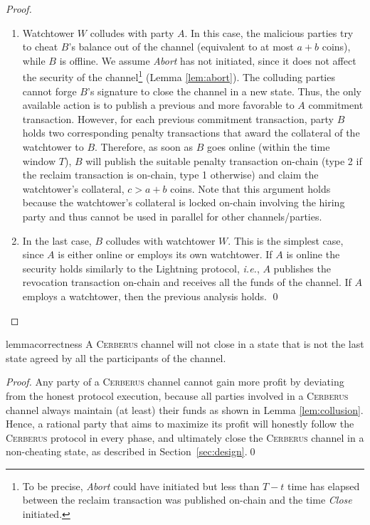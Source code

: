 \documentclass[runningheads]{llncs}
\newcommand{\ie}{{\em i.e.}}
\newcommand{\sys}{\textsc{Cerberus}\xspace}
\begin{document}
\begin{proof}
\begin{enumerate}[label=(\roman*)]
    \item Watchtower $W$ colludes with party $A$.
    In this case, the malicious parties try to cheat $B$'s balance out of the channel (equivalent to at most $a+b$ coins), while $B$ is offline.
    We assume \textit{Abort} has not initiated, since it does not affect the security of the channel\footnote{To be precise, \textit{Abort} could have initiated but less than $T-t$ time has elapsed between the reclaim transaction was published on-chain and the time \textit{Close} initiated.} (Lemma \ref{lem:abort}).
    The colluding parties cannot forge $B$'s signature to close the channel in a new state. Thus, the only available action is to publish a previous and more favorable to $A$ commitment transaction.
    However, for each previous commitment transaction, party $B$ holds two corresponding penalty transactions that award the collateral of the watchtower to $B$. Therefore, as soon as $B$ goes online (within the time window $T$), $B$ will publish the suitable penalty transaction on-chain (type 2 if the reclaim transaction is on-chain, type 1 otherwise) and claim the watchtower's collateral, $c>a+b$ coins.
    Note that this argument holds because the watchtower's collateral is locked on-chain involving the hiring party and thus cannot be used in parallel for other channels/parties.

    \item In the last case, $B$ colludes with watchtower $W$.
    This is the simplest case, since $A$ is either online or employs its own watchtower. If $A$ is online the security holds similarly to the Lightning protocol, \ie, $A$ publishes the revocation transaction on-chain and receives all the funds of the channel. If $A$ employs a watchtower, then the previous analysis holds. \hfill \qed
 \end{enumerate}
\end{proof}

\vspace{-4pt}
\begin{restatable}{lemma}{correctness}\label{lem:correctness}
A \sys channel will not close in a state that is not the last state agreed by all the participants of the channel.
\end{restatable}
\begin{proof}
Any party of a \sys channel cannot gain more profit by deviating from the honest protocol execution, because all parties involved in a \sys channel always maintain (at least) their funds as shown in Lemma \ref{lem:collusion}. Hence, a rational party that aims to maximize its profit will honestly follow the \sys protocol in every phase, and ultimately close the \sys channel in a non-cheating state, as described in Section~\ref{sec:design}.\hfill \qed
\end{proof}
\end{document}
